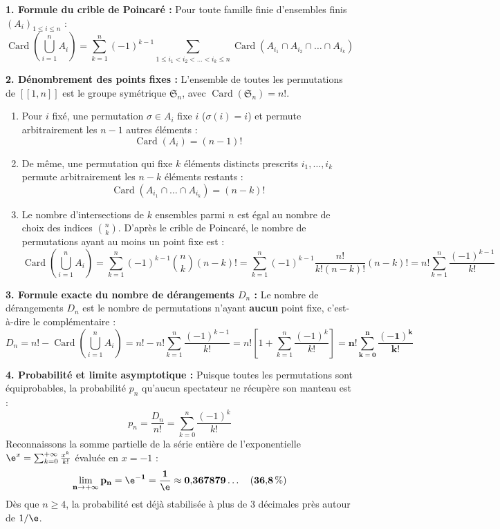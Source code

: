 \documentclass[11pt,a4paper]{article}
\begin{document}
\begin{correctionbox}
\textbf{1. Formule du crible de Poincaré :}
Pour toute famille finie d'ensembles finis $(A_i)_{1 \le i \le n}$ :
\[
\operatorname{Card}\left(\bigcup_{i=1}^n A_i\right) = \sum_{k=1}^n (-1)^{k-1} \sum_{1 \le i_1 < i_2 < \dots < i_k \le n} \operatorname{Card}(A_{i_1} \cap A_{i_2} \cap \dots \cap A_{i_k})
\]

\textbf{2. Dénombrement des points fixes :}
L'ensemble de toutes les permutations de $[\![1, n]\!]$ est le groupe symétrique $\mathfrak{S}_n$, avec $\operatorname{Card}(\mathfrak{S}_n) = n!$.
\begin{enumerate}[label=(\alph*)]
    \item Pour $i$ fixé, une permutation $\sigma \in A_i$ fixe $i$ ($\sigma(i) = i$) et permute arbitrairement les $n - 1$ autres éléments :
    \[
    \operatorname{Card}(A_i) = (n - 1)!
    \]
    \item De même, une permutation qui fixe $k$ éléments distincts prescrits $i_1, \dots, i_k$ permute arbitrairement les $n - k$ éléments restants :
    \[
    \operatorname{Card}(A_{i_1} \cap \dots \cap A_{i_k}) = (n - k)!
    \]
    \item Le nombre d'intersections de $k$ ensembles parmi $n$ est égal au nombre de choix des indices $\binom{n}{k}$.
    D'après le crible de Poincaré, le nombre de permutations ayant au moins un point fixe est :
    \[
    \operatorname{Card}\left(\bigcup_{i=1}^n A_i\right) = \sum_{k=1}^n (-1)^{k-1} \binom{n}{k} (n - k)! = \sum_{k=1}^n (-1)^{k-1} \frac{n!}{k!(n-k)!} (n - k)! = n! \sum_{k=1}^n \frac{(-1)^{k-1}}{k!}
    \]
\end{enumerate}

\textbf{3. Formule exacte du nombre de dérangements $D_n$ :}
Le nombre de dérangements $D_n$ est le nombre de permutations n'ayant \textbf{aucun} point fixe, c'est-à-dire le complémentaire :
\[
D_n = n! - \operatorname{Card}\left(\bigcup_{i=1}^n A_i\right) = n! - n! \sum_{k=1}^n \frac{(-1)^{k-1}}{k!} = n! \left[ 1 + \sum_{k=1}^n \frac{(-1)^k}{k!} \right] = \mathbf{n! \sum_{k=0}^n \frac{(-1)^k}{k!}}
\]

\textbf{4. Probabilité et limite asymptotique :}
Puisque toutes les permutations sont équiprobables, la probabilité $p_n$ qu'aucun spectateur ne récupère son manteau est :
\[
p_n = \frac{D_n}{n!} = \sum_{k=0}^n \frac{(-1)^k}{k!}
\]
Reconnaissons la somme partielle de la série entière de l'exponentielle $\e^x = \sum_{k=0}^{+\infty} \frac{x^k}{k!}$ évaluée en $x = -1$ :
\[
\mathbf{\lim_{n \to +\infty} p_n = \e^{-1} = \frac{1}{\e} \approx 0{,}367879\dots \quad (36{,}8\,\%)}
\]
Dès que $n \ge 4$, la probabilité est déjà stabilisée à plus de 3 décimales près autour de $1/\e$.
\end{correctionbox}
\end{document}
